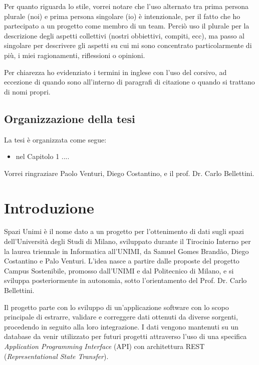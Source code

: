 \documentclass[12pt]{report}
\begin{document}
Per quanto riguarda lo stile, vorrei notare che l'uso alternato tra prima
persona plurale (noi) e prima persona singolare (io) è intenzionale, per
il fatto che ho partecipato a un progetto come membro di un team. Perciò
uso il plurale per la descrizione degli aspetti collettivi 
(nostri obbiettivi, compiti, ecc), ma passo al singolare per descrivere gli
aspetti su cui mi sono concentrato particolarmente di più, i miei
ragionamenti, riflessioni o opinioni.

Per chiarezza ho evidenziato i termini in inglese con l'uso del corsivo, 
ad eccezione di quando sono all'interno di paragrafi di citazione o quando
si trattano di nomi propri.

%
%
\section*{Organizzazione della tesi}
\label{organizzazione}
La tesi \`e organizzata come segue:
\begin{itemize}
\item nel Capitolo 1 ....
\end{itemize}
%
%
Vorrei ringraziare Paolo Venturi, Diego Costantino, 
e il prof. Dr. Carlo Bellettini. 
\afterpreface


% 
% 
\chapter{Introduzione}
\label{cap1}

Spazi Unimi è il nome dato a un progetto per l'ottenimento di dati sugli spazi dell’Università degli Studi di Milano, sviluppato durante il Tirocinio Interno per la laurea triennale in Informatica all’UNIMI, da Samuel Gomes Brandão, Diego Costantino e Palo Venturi. L'idea nasce a partire dalle proposte del progetto Campus Sostenibile, promosso dall’UNIMI e dal Politecnico di Milano, e si sviluppa posteriormente in autonomia, sotto l'orientamento del Prof. Dr. Carlo Bellettini.

Il progetto parte con lo sviluppo di un'applicazione software con lo scopo principale di estrarre, validare e correggere dati ottenuti da diverse sorgenti, procedendo in seguito alla loro integrazione. I dati vengono mantenuti su un database da venir utilizzato per futuri progetti attraverso l'uso di una specifica 
\textit{Application Programming Interface} (API) con architettura REST 
(\textit{Representational State Transfer}). 
\end{document}
